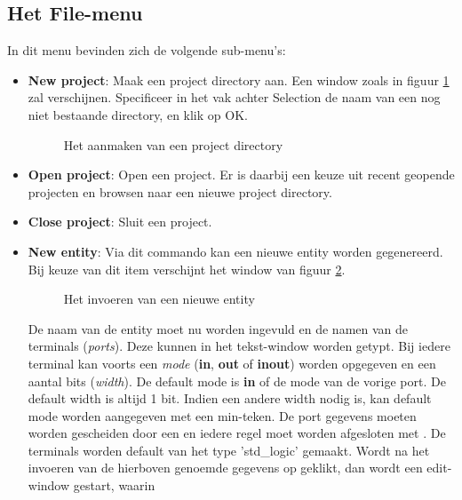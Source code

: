 \subsection{Het File-menu}
In dit menu bevinden zich de volgende sub-menu's:
\begin{itemize}
\item {\bf New project}: Maak een project directory aan.
		Een window zoals in figuur \ref{newproj} zal verschijnen.
		Specificeer in het vak achter Selection de naam van een nog niet
		bestaande directory, en klik op OK.
		\begin{figure}[h]
		\centerline{}
		\caption{Het aanmaken van een project directory}
		\label{newproj}
		\end{figure}
\item {\bf Open project}: Open een project.  
                Er is daarbij een keuze uit recent geopende projecten en browsen naar
                een nieuwe project directory.
\item {\bf Close project}: Sluit een project.
\item {\bf New entity}: Via dit commando kan een nieuwe entity worden
                         gegenereerd.
               Bij keuze van dit item verschijnt het window van
               figuur \ref{newcell-window}.
               \begin{figure}[htb]
               \centerline{}
               \caption{Het invoeren van een nieuwe entity}
               \label{newcell-window}
               \end{figure}
               De naam van de entity moet nu worden ingevuld en de
               namen van de terminals ({\it ports}).
               Deze kunnen in het tekst-window worden getypt.
               Bij iedere terminal kan voorts
	       een {\it mode} ({\bf in}, {\bf out} of {\bf inout})
	       worden opgegeven en een aantal bits ({\it width}).
	       De default mode is {\bf in} of de mode van de vorige port.
	       De default width is altijd 1 bit.
	       Indien een andere width nodig is, kan default mode worden
	       aangegeven met een min-teken.
               De port gegevens moeten worden gescheiden door een 
	       en iedere regel moet worden afgesloten met .
               De terminals worden default van het type 'std\_logic' gemaakt.
               Wordt na het invoeren van de hierboven genoemde gegevens
               op  geklikt, dan wordt een edit-window gestart, waarin

\end{itemize}
